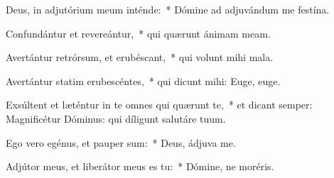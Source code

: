 \item Deus, in adjutórium meum inténde:~* Dómine ad adjuvándum me festína.

\item Confundántur et revereántur,~* qui quærunt ánimam meam.

\item Avertántur retrórsum, et erubéscant,~* qui volunt mihi mala.

\item Avertántur statim erubescéntes,~* qui dicunt mihi: Euge, euge.

\item Exsúltent et læténtur in te omnes qui quærunt te,~* et dicant semper: Magnificétur Dóminus: qui díligunt salutáre tuum.

\item Ego vero egénus, et pauper sum:~* Deus, ádjuva me.

\item Adjútor meus, et liberátor meus es tu:~* Dómine, ne moréris.


